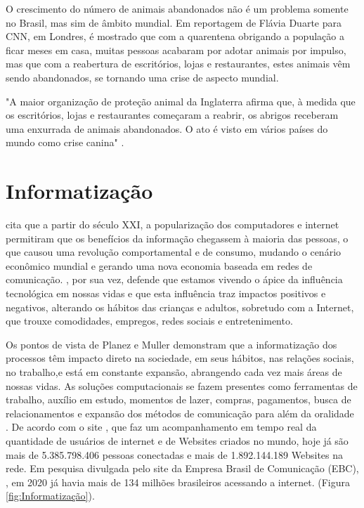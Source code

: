 O crescimento do número de animais abandonados não é um problema somente no Brasil, mas sim de âmbito mundial. Em reportagem de Flávia Duarte para CNN, em Londres, é mostrado que com a quarentena obrigando a população a ficar meses em casa, muitas pessoas acabaram por adotar animais por impulso, mas que com a reabertura de escritórios, lojas e restaurantes, estes animais vêm sendo abandonados, se tornando uma crise de aspecto mundial.

\begin{citacao}
"A maior organização de proteção animal da Inglaterra afirma que, à medida que os escritórios, lojas e restaurantes 	começaram a reabrir, os abrigos receberam uma enxurrada de animais abandonados. O ato é visto em vários países do mundo como crise canina" \cite{Duarte}.
\end{citacao}


\section{Informatização}
\label{sec:Informatização}
 cita que a partir do século XXI, a popularização dos computadores e internet permitiram que os benefícios da informação chegassem à maioria das pessoas, o que causou uma revolução comportamental e de consumo, mudando o cenário econômico mundial e gerando uma nova economia baseada em redes de comunicação. , por sua vez, defende que estamos vivendo o ápice da influência tecnológica em nossas vidas e que esta influência traz impactos positivos e negativos, alterando os hábitos das crianças e adultos, sobretudo com a Internet, que trouxe comodidades, empregos, redes sociais e entretenimento. 

Os pontos de vista de Planez e Muller demonstram que a informatização dos processos têm impacto direto na sociedade, em seus hábitos, nas relações sociais, no trabalho,e está em constante expansão, abrangendo cada vez mais áreas de nossas vidas. As soluções computacionais se fazem presentes como ferramentas de trabalho, auxílio em estudo, momentos de lazer, compras, pagamentos, busca de relacionamentos e expansão dos métodos de comunicação para além da oralidade \cite{Muller}. 
De acordo com o site , que faz um acompanhamento em tempo real da quantidade de usuários de internet e de Websites criados no mundo, hoje já são mais de 5.385.798.406 pessoas conectadas e mais de 1.892.144.189 Websites na rede. Em pesquisa divulgada pelo site da Empresa Brasil de Comunicação (\gls{EBC}), , em 2020 já havia mais de 134 milhões brasileiros acessando a internet. (Figura \ref{fig:Informatização}).


